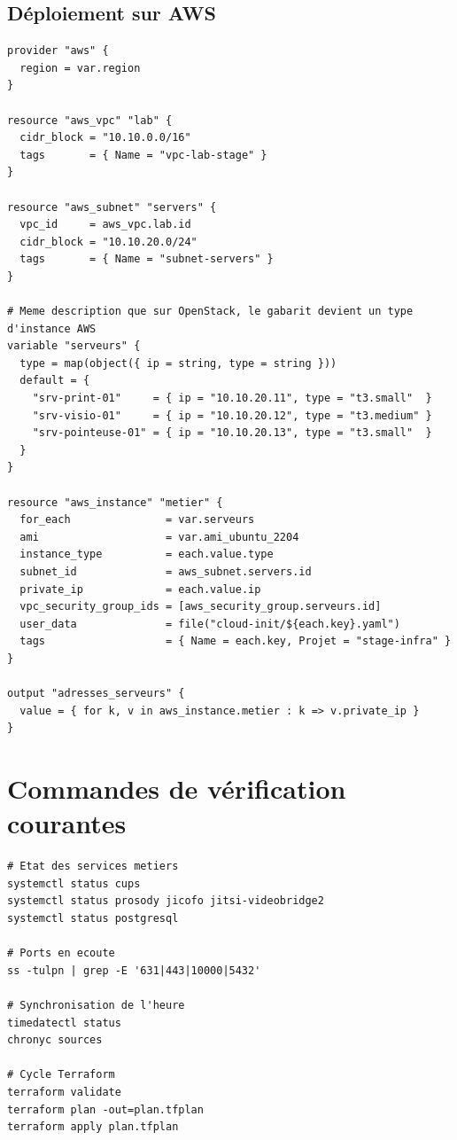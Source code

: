 \documentclass[11pt,a4paper]{article}
\begin{document}
\subsection{Déploiement sur AWS}
\begin{lstlisting}[style=code]
provider "aws" {
  region = var.region
}

resource "aws_vpc" "lab" {
  cidr_block = "10.10.0.0/16"
  tags       = { Name = "vpc-lab-stage" }
}

resource "aws_subnet" "servers" {
  vpc_id     = aws_vpc.lab.id
  cidr_block = "10.10.20.0/24"
  tags       = { Name = "subnet-servers" }
}

# Meme description que sur OpenStack, le gabarit devient un type d'instance AWS
variable "serveurs" {
  type = map(object({ ip = string, type = string }))
  default = {
    "srv-print-01"     = { ip = "10.10.20.11", type = "t3.small"  }
    "srv-visio-01"     = { ip = "10.10.20.12", type = "t3.medium" }
    "srv-pointeuse-01" = { ip = "10.10.20.13", type = "t3.small"  }
  }
}

resource "aws_instance" "metier" {
  for_each               = var.serveurs
  ami                    = var.ami_ubuntu_2204
  instance_type          = each.value.type
  subnet_id              = aws_subnet.servers.id
  private_ip             = each.value.ip
  vpc_security_group_ids = [aws_security_group.serveurs.id]
  user_data              = file("cloud-init/${each.key}.yaml")
  tags                   = { Name = each.key, Projet = "stage-infra" }
}

output "adresses_serveurs" {
  value = { for k, v in aws_instance.metier : k => v.private_ip }
}
\end{lstlisting}

\section{Commandes de vérification courantes}
\begin{lstlisting}[style=code]
# Etat des services metiers
systemctl status cups
systemctl status prosody jicofo jitsi-videobridge2
systemctl status postgresql

# Ports en ecoute
ss -tulpn | grep -E '631|443|10000|5432'

# Synchronisation de l'heure
timedatectl status
chronyc sources

# Cycle Terraform
terraform validate
terraform plan -out=plan.tfplan
terraform apply plan.tfplan
\end{lstlisting}
\end{document}
